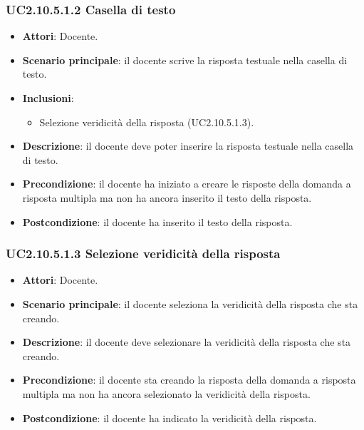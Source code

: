 \subsubsection{UC2.10.5.1.2 Casella di testo}
\begin{itemize}
\item \textbf{Attori}: Docente.
\item \textbf{Scenario principale}: il docente scrive la risposta testuale nella casella di testo.
\item \textbf{Inclusioni}:
\begin{itemize}
\item Selezione veridicità della risposta (UC2.10.5.1.3).
\end{itemize}
\item \textbf{Descrizione}: il docente deve poter inserire la risposta testuale nella casella di testo.
\item \textbf{Precondizione}: il docente ha iniziato a creare le risposte della domanda a risposta multipla ma non ha ancora inserito il testo della risposta.
\item \textbf{Postcondizione}: il docente ha inserito il testo della risposta.
\end{itemize}
\subsubsection{UC2.10.5.1.3 Selezione veridicità della risposta}
\begin{itemize}
\item \textbf{Attori}: Docente.
\item \textbf{Scenario principale}: il docente seleziona la veridicità della risposta che sta creando.
\item \textbf{Descrizione}: il docente deve selezionare la veridicità della risposta che sta creando.
\item \textbf{Precondizione}: il docente sta creando la risposta della domanda a risposta multipla ma non ha ancora selezionato la veridicità della risposta.
\item \textbf{Postcondizione}: il docente ha indicato la veridicità della risposta.
\end{itemize}
